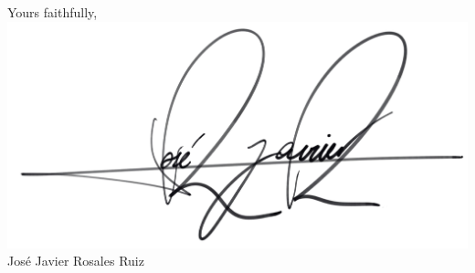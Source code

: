\documentclass[11pt,a4paper]{letter}
\begin{document}
\vspace{15pt}

Yours faithfully,
\vspace{10pt} 
\newline
\includegraphics[scale=0.1]{Images/signature.png} \vspace{6pt} \newline
José Javier Rosales Ruiz

 
\end{document}
